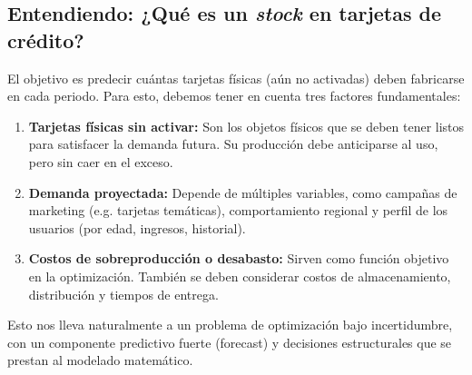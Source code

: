 \subsection*{Entendiendo: ¿Qué es un \textit{stock} en tarjetas de crédito?}

El objetivo es predecir cuántas tarjetas físicas (aún no activadas) deben fabricarse en cada periodo. Para esto, debemos tener en cuenta tres factores fundamentales:

\begin{enumerate}
	\item \textbf{Tarjetas físicas sin activar:} Son los objetos físicos que se deben tener listos para satisfacer la demanda futura. Su producción debe anticiparse al uso, pero sin caer en el exceso.
	
	\item \textbf{Demanda proyectada:} Depende de múltiples variables, como campañas de marketing (e.g. tarjetas temáticas), comportamiento regional y perfil de los usuarios (por edad, ingresos, historial).
	
	\item \textbf{Costos de sobreproducción o desabasto:} Sirven como función objetivo en la optimización. También se deben considerar costos de almacenamiento, distribución y tiempos de entrega.
\end{enumerate}

Esto nos lleva naturalmente a un problema de optimización bajo incertidumbre, con un componente predictivo fuerte (forecast) y decisiones estructurales que se prestan al modelado matemático.
